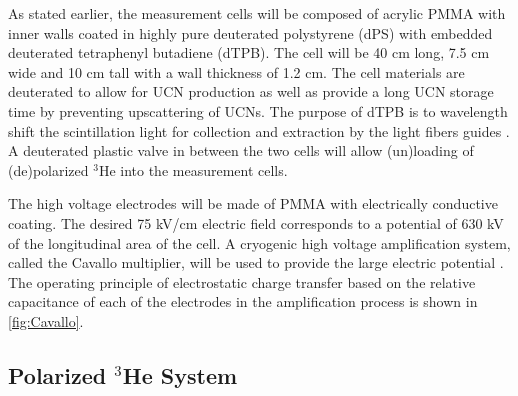 As stated earlier, the measurement cells will be composed of acrylic PMMA with inner walls coated in highly pure deuterated polystyrene (dPS) with embedded deuterated tetraphenyl butadiene (dTPB). The cell will be 40 cm long, 7.5 cm wide and 10 cm tall with a wall thickness of 1.2 cm. The cell materials are deuterated to allow for UCN production as well as provide a long UCN storage time by preventing upscattering of UCNs. The purpose of dTPB is to wavelength shift the scintillation light for collection and extraction by the light fibers guides \cite{McKinsey1997}. A deuterated plastic valve in between the two cells will allow (un)loading of (de)polarized $^3$He into the measurement cells. 

The high voltage electrodes will be made of PMMA with electrically conductive coating. The desired 75 kV/cm electric field corresponds to a potential of 630 kV of the longitudinal area of the cell. A cryogenic high voltage amplification system, called the Cavallo multiplier, will be used to provide the large electric potential \cite{Ahmed2019}. The operating principle of electrostatic charge transfer based on the relative capacitance of each of the electrodes in the amplification process is shown in \cref{fig:Cavallo}.


\subsection{Polarized ${^3}$He System}


